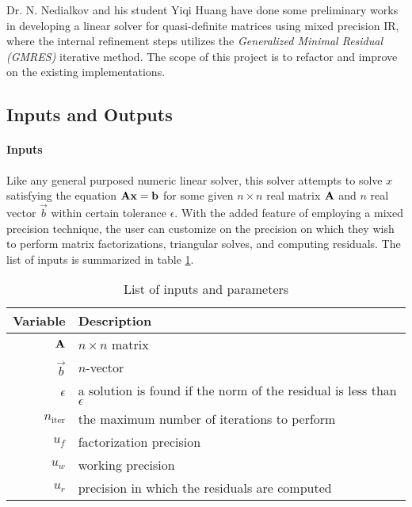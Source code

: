 \documentclass{article}
\begin{document}
Dr. N. Nedialkov and his student Yiqi Huang have done some preliminary works in
developing a linear solver for quasi-definite matrices using mixed precision IR,
where the internal refinement steps utilizes the \emph{Generalized Minimal
  Residual (GMRES)} iterative method. The scope of this project is to refactor
and improve on the existing implementations.

\subsection{Inputs and Outputs}


\paragraph{Inputs}

Like any general purposed numeric linear solver, this solver attempts to solve
\(x\) satisfying the equation \(\mathbf{A}\mathbf{x} = \mathbf{b}\) for some given \(n
\times n\) real matrix \(\mathbf{A}\) and \(n\) real vector \(\vec{b}\) within
certain tolerance \(\epsilon\). With the added feature of employing a mixed
precision technique, the user can customize on the precision on which they wish
to perform matrix factorizations, triangular solves, and computing residuals.
The list of inputs is summarized in table \ref{tab:inputs}.

\begin{table}[hp]
  \centering
  \caption{List of inputs and parameters}
  \label{tab:inputs}
  \begin{tabularx}{1.0\linewidth}{rX}
    \toprule
    \textbf{Variable}  & \textbf{Description} \\
    \midrule
    \(\mathbf{A}\) & \(n \times n\) matrix \\
    \(\vec{b}\)        & \(n\)-vector \\
    \(\epsilon\)        & a solution is found if the norm of the residual is less than \(\epsilon\) \\
    \(n_\mathrm{iter}\) & the maximum number of iterations to perform \\
    \(u_f\)       & factorization precision \\
    \(u_w\)       & working precision \\
    \(u_r\)       & precision in which the residuals are computed \\
    \bottomrule
  \end{tabularx}
\end{table}
\end{document}
